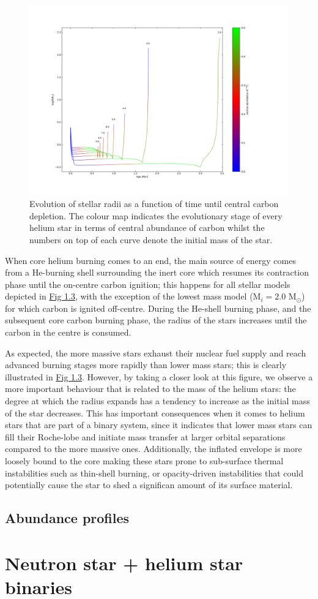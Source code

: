 \documentclass[../../main/thesis_msc.tex]{subfiles}
\begin{document}
					\begin{figure}[h]
						\centering
						\includegraphics[scale=0.4]{../figures/chapter3/radius_evolution_gradient.png}
						\caption{Evolution of stellar radii as a function of time until central carbon depletion. The colour map indicates the evolutionary stage of every helium star in terms of central abundance of carbon whilst the numbers on top of each curve denote the initial mass of the star.}
						\label{fig:radii_singles}
					\end{figure}
					
					When core helium burning comes to an end, the main source of energy comes from a He-burning shell surrounding the inert core which resumes its contraction phase until the on-centre carbon ignition; this happens for all stellar models depicted in \hyperref[fig:radii_singles]{Fig 1.3}, with the exception of the lowest mass model (M$_{i} = 2.0$ M$_{\odot}$) for which carbon is ignited off-centre. During the He-shell burning phase, and the subsequent core carbon burning phase, the radius of the stars increases until the carbon in the centre is consumed.
					
					As expected, the more massive stars exhaust their nuclear fuel supply and reach advanced burning stages more rapidly than lower mass stars; this is clearly illustrated in \hyperref[fig:radii_singles]{Fig 1.3}. However, by taking a closer look at this figure, we observe a more important behaviour that is related to the mass of the helium stars: the degree at which the radius expands has a tendency to increase as the initial mass of the star decreases. This has important consequences when it comes to helium stars that are part of a binary system, since it indicates that lower mass stars can fill their Roche-lobe and initiate mass transfer at larger orbital separations compared to the more massive ones. Additionally, the inflated envelope is more loosely bound to the core making these stars prone to sub-surface thermal instabilities such as thin-shell burning, or opacity-driven instabilities that could potentially cause the star to shed a significan amount of its surface material. %
				
				
				\subsection{Abundance profiles}	
			
			
			
			\section{Neutron star + helium star binaries}
\end{document}
